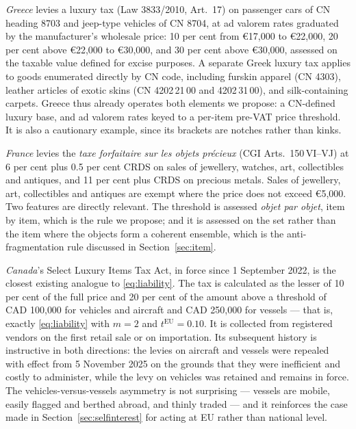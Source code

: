 \emph{Greece} levies a luxury tax (Law 3833/2010, Art.~17) on passenger cars of CN heading 8703 and
jeep-type vehicles of CN 8704, at ad valorem rates graduated by the manufacturer's wholesale price:
10 per cent from \euro{}17{,}000 to \euro{}22{,}000, 20 per cent above \euro{}22{,}000 to
\euro{}30{,}000, and 30 per cent above \euro{}30{,}000, assessed on the taxable value defined for
excise purposes. A separate Greek luxury tax applies to goods enumerated directly by CN code,
including furskin apparel (CN 4303), leather articles of exotic skins (CN 4202\,21\,00 and
4202\,31\,00), and silk-containing carpets. Greece thus already operates both elements we propose:
a CN-defined luxury base, and ad valorem rates keyed to a per-item pre-VAT price threshold. It is
also a cautionary example, since its brackets are notches rather than kinks.

\emph{France} levies the \emph{taxe forfaitaire sur les objets pr\'ecieux} (CGI Arts.~150\,VI--VJ)
at 6 per cent plus 0.5 per cent CRDS on sales of jewellery, watches, art, collectibles and
antiques, and 11 per cent plus CRDS on precious metals. Sales of jewellery, art, collectibles and
antiques are exempt where the price does not exceed \euro{}5{,}000. Two features are directly
relevant. The threshold is assessed \emph{objet par objet}, item by item, which is the rule we
propose; and it is assessed on the set rather than the item where the objects form a coherent
ensemble, which is the anti-fragmentation rule discussed in Section~\ref{sec:item}.

\emph{Canada}'s Select Luxury Items Tax Act, in force since 1 September 2022, is the closest
existing analogue to \eqref{eq:liability}. The tax is calculated as the lesser of 10 per cent of the
full price and 20 per cent of the amount above a threshold of CAD 100{,}000 for vehicles and
aircraft and CAD 250{,}000 for vessels --- that is, exactly \eqref{eq:liability} with $m=2$ and
$t^{\mathrm{EU}}=0.10$. It is collected from registered vendors on the first retail sale or on
importation. Its subsequent history is instructive in both directions: the levies on aircraft and
vessels were repealed with effect from 5 November 2025 on the grounds that they were inefficient and
costly to administer, while the levy on vehicles was retained and remains in force. The
vehicles-versus-vessels asymmetry is not surprising --- vessels are mobile, easily flagged and
berthed abroad, and thinly traded --- and it reinforces the case made in Section~\ref{sec:selfinterest}
for acting at EU rather than national level.

